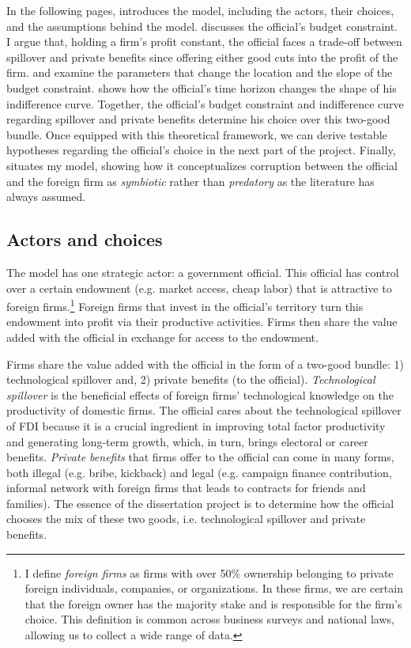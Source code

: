 In the following pages,  introduces the model, including the actors, their choices, and the assumptions behind the model.  discusses the official's budget constraint. I argue that, holding a firm's profit constant, the official faces a trade-off between spillover and private benefits since offering either good cuts into the profit of the firm.  and  examine the parameters that change the location and the slope of the budget constraint.  shows how the official's time horizon changes the shape of his indifference curve. Together, the official's budget constraint and indifference curve regarding spillover and private benefits determine his choice over this two-good bundle. Once equipped with this theoretical framework, we can derive testable hypotheses regarding the official's choice in the next part of the project. Finally,  situates my model, showing how it conceptualizes corruption between the official and the foreign firm as \textit{symbiotic} rather than \textit{predatory} as the literature has always assumed.

\subsection{Actors and choices}
\label{sec:theory_actors_and_choices}

The model has one strategic actor: a government official. This official has control over a certain endowment (e.g. market access, cheap labor) that is attractive to foreign firms.\footnote{I define \textit{foreign firms} as firms with over 50\% ownership belonging to private foreign individuals, companies, or organizations. In these firms, we are certain that the foreign owner has the majority stake and is responsible for the firm's choice. This definition is common across business surveys and national laws, allowing us to collect a wide range of data.} Foreign firms that invest in the official's territory turn this endowment into profit via their productive activities. Firms then share the value added with the official in exchange for access to the endowment. 

Firms share the value added with the official in the form of a two-good bundle: 1) technological spillover and, 2) private benefits (to the official). \textit{Technological spillover} is the beneficial effects of foreign firms' technological knowledge on the productivity of domestic firms. The official cares about the technological spillover of FDI because it is a crucial ingredient in improving total factor productivity and generating long-term growth, which, in turn, brings electoral or career benefits. \textit{Private benefits} that firms offer to the official can come in many forms, both illegal (e.g. bribe, kickback) and legal (e.g. campaign finance contribution, informal network with foreign firms that leads to contracts for friends and families). The essence of the dissertation project is to determine how the official chooses the mix of these two goods, i.e. technological spillover and private benefits.

